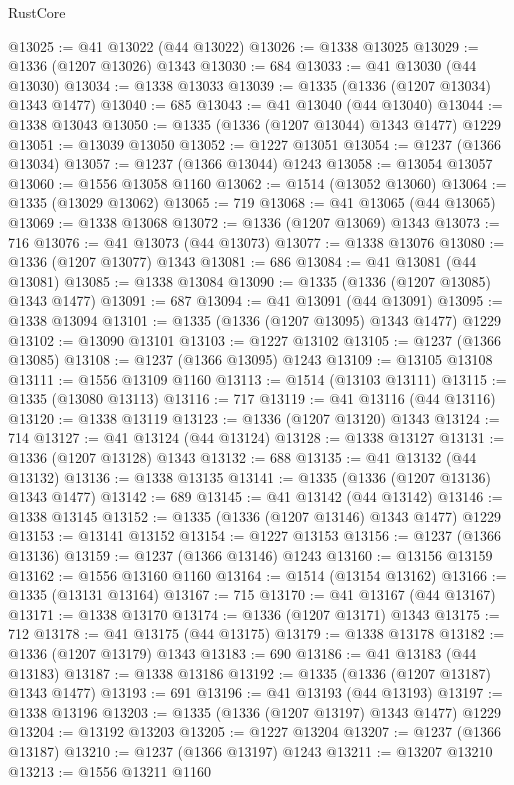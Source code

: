 \begin{lexlean}{RustCore}
\begin{coremodule}
@13025 := @41 @13022 (@44 @13022)
@13026 := @1338 @13025
@13029 := @1336 (@1207 @13026) @1343
@13030 := 684
@13033 := @41 @13030 (@44 @13030)
@13034 := @1338 @13033
@13039 := @1335 (@1336 (@1207 @13034) @1343 @1477)
@13040 := 685
@13043 := @41 @13040 (@44 @13040)
@13044 := @1338 @13043
@13050 := @1335 (@1336 (@1207 @13044) @1343 @1477) @1229
@13051 := @13039 @13050
@13052 := @1227 @13051
@13054 := @1237 (@1366 @13034)
@13057 := @1237 (@1366 @13044) @1243
@13058 := @13054 @13057
@13060 := @1556 @13058 @1160
@13062 := @1514 (@13052 @13060)
@13064 := @1335 (@13029 @13062)
@13065 := 719
@13068 := @41 @13065 (@44 @13065)
@13069 := @1338 @13068
@13072 := @1336 (@1207 @13069) @1343
@13073 := 716
@13076 := @41 @13073 (@44 @13073)
@13077 := @1338 @13076
@13080 := @1336 (@1207 @13077) @1343
@13081 := 686
@13084 := @41 @13081 (@44 @13081)
@13085 := @1338 @13084
@13090 := @1335 (@1336 (@1207 @13085) @1343 @1477)
@13091 := 687
@13094 := @41 @13091 (@44 @13091)
@13095 := @1338 @13094
@13101 := @1335 (@1336 (@1207 @13095) @1343 @1477) @1229
@13102 := @13090 @13101
@13103 := @1227 @13102
@13105 := @1237 (@1366 @13085)
@13108 := @1237 (@1366 @13095) @1243
@13109 := @13105 @13108
@13111 := @1556 @13109 @1160
@13113 := @1514 (@13103 @13111)
@13115 := @1335 (@13080 @13113)
@13116 := 717
@13119 := @41 @13116 (@44 @13116)
@13120 := @1338 @13119
@13123 := @1336 (@1207 @13120) @1343
@13124 := 714
@13127 := @41 @13124 (@44 @13124)
@13128 := @1338 @13127
@13131 := @1336 (@1207 @13128) @1343
@13132 := 688
@13135 := @41 @13132 (@44 @13132)
@13136 := @1338 @13135
@13141 := @1335 (@1336 (@1207 @13136) @1343 @1477)
@13142 := 689
@13145 := @41 @13142 (@44 @13142)
@13146 := @1338 @13145
@13152 := @1335 (@1336 (@1207 @13146) @1343 @1477) @1229
@13153 := @13141 @13152
@13154 := @1227 @13153
@13156 := @1237 (@1366 @13136)
@13159 := @1237 (@1366 @13146) @1243
@13160 := @13156 @13159
@13162 := @1556 @13160 @1160
@13164 := @1514 (@13154 @13162)
@13166 := @1335 (@13131 @13164)
@13167 := 715
@13170 := @41 @13167 (@44 @13167)
@13171 := @1338 @13170
@13174 := @1336 (@1207 @13171) @1343
@13175 := 712
@13178 := @41 @13175 (@44 @13175)
@13179 := @1338 @13178
@13182 := @1336 (@1207 @13179) @1343
@13183 := 690
@13186 := @41 @13183 (@44 @13183)
@13187 := @1338 @13186
@13192 := @1335 (@1336 (@1207 @13187) @1343 @1477)
@13193 := 691
@13196 := @41 @13193 (@44 @13193)
@13197 := @1338 @13196
@13203 := @1335 (@1336 (@1207 @13197) @1343 @1477) @1229
@13204 := @13192 @13203
@13205 := @1227 @13204
@13207 := @1237 (@1366 @13187)
@13210 := @1237 (@1366 @13197) @1243
@13211 := @13207 @13210
@13213 := @1556 @13211 @1160

\end{coremodule}
\end{lexlean}

